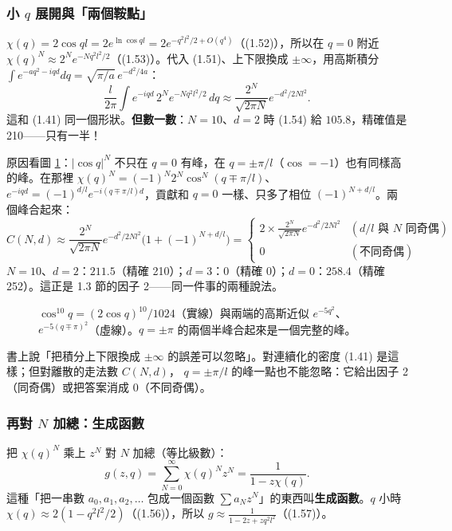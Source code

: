 \subsubsection*{小 $q$ 展開與「兩個鞍點」}
$\chi(q)=2\cos ql=2e^{\ln\cos ql}=2e^{-q^2l^2/2+O(q^4)}$（(1.52)），所以在 $q=0$ 附近 $\chi(q)^N\approx2^Ne^{-Nq^2l^2/2}$（(1.53)）。代入 (1.51)、上下限換成 $\pm\infty$，用高斯積分
$\int e^{-aq^2-iqd}dq=\sqrt{\pi/a}\,e^{-d^2/4a}$：
\begin{equation}
\frac{l}{2\pi}\int e^{-iqd}\,2^Ne^{-Nq^2l^2/2}\,dq\approx\frac{2^N}{\sqrt{2\pi N}}e^{-d^2/2Nl^2}. \tag{1.54}
\end{equation}
這和 (1.41) 同一個形狀。\textbf{但數一數}：$N=10$、$d=2$ 時 (1.54) 給 $105.8$，精確值是 210——只有一半！

原因看圖 \ref{fig:chipower}：$|\cos q|^N$ 不只在 $q=0$ 有峰，在 $q=\pm\pi/l$（$\cos=-1$）也有同樣高的峰。在那裡
$\chi(q)^N=(-1)^N2^N\cos^N(q\mp\pi/l)$、$e^{-iqd}=(-1)^{d/l}e^{-i(q\mp\pi/l)d}$，貢獻和 $q=0$ 一樣、只多了相位 $(-1)^{N+d/l}$。兩個峰合起來：
\[
C(N,d)\approx\frac{2^N}{\sqrt{2\pi N}}e^{-d^2/2Nl^2}\big(1+(-1)^{N+d/l}\big)=
\begin{cases}2\times\frac{2^N}{\sqrt{2\pi N}}e^{-d^2/2Nl^2}&(d/l\text{ 與 }N\text{ 同奇偶})\\0&(\text{不同奇偶})\end{cases}
\]
$N=10$、$d=2$：$211.5$（精確 210）；$d=3$：0（精確 0）；$d=0$：$258.4$（精確 252）。這正是 1.3 節的因子 2——同一件事的兩種說法。

\begin{figure}[H]
\centering
\FigChiPower
\caption{$\cos^{10}q=(2\cos q)^{10}/1024$（實線）與兩端的高斯近似 $e^{-5q^2}$、$e^{-5(q\mp\pi)^2}$（虛線）。$q=\pm\pi$ 的兩個半峰合起來是一個完整的峰。}
\label{fig:chipower}
\end{figure}

\begin{errbox}[p.~16，(1.54) 後]
書上說「把積分上下限換成 $\pm\infty$ 的誤差可以忽略」。對連續化的密度 (1.41) 是這樣；但對離散的走法數 $C(N,d)$，
$q=\pm\pi/l$ 的峰一點也不能忽略：它給出因子 2（同奇偶）或把答案消成 0（不同奇偶）。
\end{errbox}

\subsubsection*{再對 $N$ 加總：生成函數}
把 $\chi(q)^N$ 乘上 $z^N$ 對 $N$ 加總（等比級數）：
\begin{equation}
g(z,q)=\sum_{N=0}^\infty\chi(q)^Nz^N=\frac1{1-z\chi(q)}. \tag{1.55}
\end{equation}
這種「把一串數 $a_0,a_1,a_2,\dots$ 包成一個函數 $\sum a_Nz^N$」的東西叫\textbf{生成函數}。$q$ 小時 $\chi(q)\approx2(1-q^2l^2/2)$（(1.56)），所以
$g\approx\frac{1}{1-2z+zq^2l^2}$（(1.57)）。

